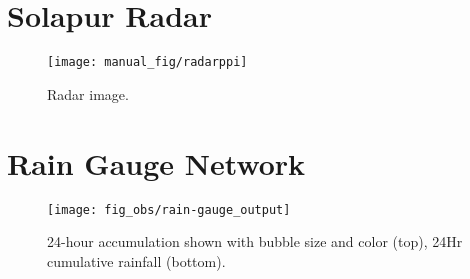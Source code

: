 \documentclass[12pt,a4paper]{article} %
\begin{document}
\section{Solapur Radar}
\begin{figure}[H]
\centering
\texttt{[image: manual\_fig/radarppi]}
\caption{Radar image. }
\end{figure}

\section{Rain Gauge Network}
\begin{figure}[H]
\centering
\texttt{[image: fig\_obs/rain-gauge\_output]}
\caption{24-hour accumulation shown with bubble size and color (top), 24Hr cumulative rainfall (bottom).}
\end{figure}








\end{document}
